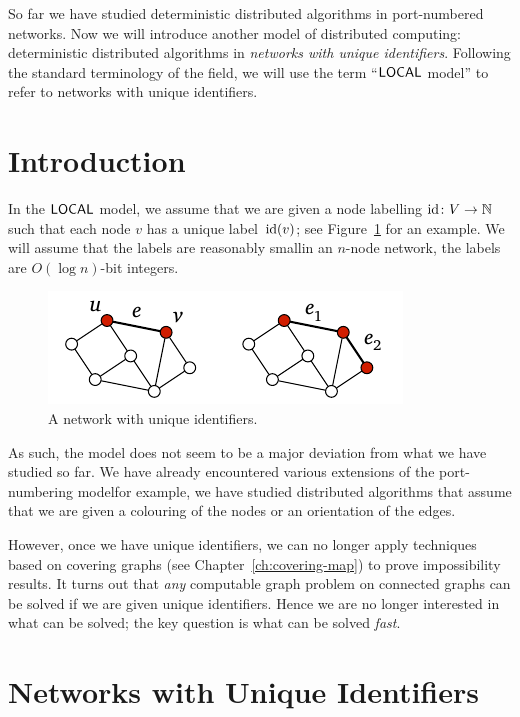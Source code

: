 
So far we have studied deterministic distributed algorithms in port-numbered networks. Now we will introduce another model of distributed computing: deterministic distributed algorithms in \emph{networks with unique identifiers}. Following the standard terminology of the field, we will use the term ``$\textsf{LOCAL}$ model'' to refer to networks with unique identifiers.


\section{Introduction}

In the $\textsf{LOCAL}$ model, we assume that we are given a node labelling $\operatorname{id}\colon V \to \mathbb{N}$ such that each node $v$ has a unique label~$\operatorname{id}(v)$; see Figure~\ref{fig:unique-ids} for an example. We will assume that the labels are reasonably small\mydash in an $n$-node network, the labels are $O(\log n)$-bit integers.

\begin{figure}
    \centering
    \includegraphics[page=\PUniqueIds]{figs.pdf}
    \caption{A network with unique identifiers.}\label{fig:unique-ids}
\end{figure}

As such, the model does not seem to be a major deviation from what we have studied so far. We have already encountered various extensions of the port-numbering model\mydash for example, we have studied distributed algorithms that assume that we are given a colouring of the nodes or an orientation of the edges.

However, once we have unique identifiers, we can no longer apply techniques based on covering graphs (see Chapter~\ref{ch:covering-map}) to prove impossibility results. It turns out that \emph{any} computable graph problem on connected graphs can be solved if we are given unique identifiers. Hence we are no longer interested in what can be solved; the key question is what can be solved \emph{fast}.


\section{Networks with Unique Identifiers}

